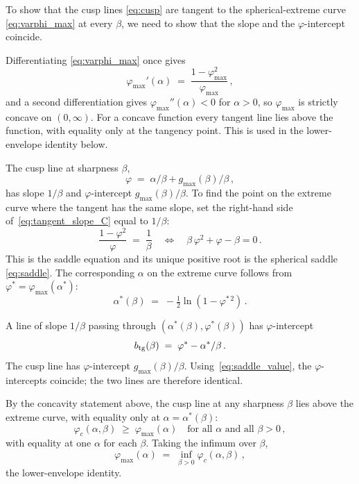 \documentclass[letterpaper]{article} %
\newcommand{\Bnet}{\beta}
\begin{document}
To show that the cusp lines \eqref{eq:cusp} are tangent to the
spherical-extreme curve \eqref{eq:varphi_max} at every
$\Bnet$, we need to show that the slope and the $\varphi$-intercept
coincide.

Differentiating \eqref{eq:varphi_max} once gives
\begin{equation}
\varphi_{\max}'(\alpha) \;=\; \frac{1-\varphi_{\max}^2}{\varphi_{\max}}\,,
\label{eq:tangent_slope_C}
\end{equation}
and a second differentiation gives $\varphi_{\max}''(\alpha) < 0$ for $\alpha > 0$,
so $\varphi_{\max}$ is strictly concave on $(0, \infty)$. For a concave function
every tangent line lies above the function, with equality only at the tangency
point. This is used in the lower-envelope identity below.

The cusp line at sharpness $\Bnet$,
\begin{equation}
\varphi \;=\; \alpha/\Bnet + g_{\max}(\Bnet)/\Bnet\,,
\end{equation}
has slope $1/\Bnet$ and $\varphi$-intercept $g_{\max}(\Bnet)/\Bnet$. To find the point on
the extreme curve where the tangent has the same slope, set the right-hand side
of~\eqref{eq:tangent_slope_C} equal to $1/\Bnet$:
\begin{equation}
\frac{1-\varphi^2}{\varphi} \;=\; \frac{1}{\Bnet}
\quad\Longleftrightarrow\quad
\Bnet\,\varphi^2 + \varphi - \Bnet = 0\,.
\label{eq:saddle_eq_C}
\end{equation}
This is the saddle equation and its unique positive root is the spherical saddle \eqref{eq:saddle}.
The corresponding $\alpha$ on the extreme curve follows from
$\varphi^* = \varphi_{\max}(\alpha^*)$:
\begin{equation}
\alpha^*(\Bnet) \;=\; -\tfrac12 \ln(1-\varphi^{*\,2})\,.
\label{eq:alpha_star_C}
\end{equation}

A line of slope $1/\Bnet$ passing through $(\alpha^*(\Bnet), \varphi^*(\Bnet))$ has
$\varphi$-intercept
\begin{equation}
b_{\rm tg}(\Bnet) \;=\; \varphi^* - \alpha^*/\Bnet\,.
\end{equation}
The cusp line has $\varphi$-intercept $g_{\max}(\Bnet)/\Bnet$.
Using~\eqref{eq:saddle_value}, the $\varphi$-intercepts coincide;
the two lines are therefore identical.

By the concavity statement above, the cusp line at any sharpness $\Bnet$ lies above the extreme curve, with equality only at
$\alpha = \alpha^*(\Bnet)$:
\begin{equation}
\varphi_c(\alpha, \Bnet) \;\ge\; \varphi_{\max}(\alpha) \quad \text{for all $\alpha$ and all $\Bnet > 0$}\,,
\end{equation}
with equality at one $\alpha$ for each $\Bnet$. Taking the infimum over $\Bnet$,
\begin{equation}
\varphi_{\max}(\alpha) \;=\; \inf_{\Bnet > 0} \varphi_c(\alpha, \Bnet)\,,
\label{eq:lower_envelope_C}
\end{equation}
the lower-envelope identity.
\end{document}
